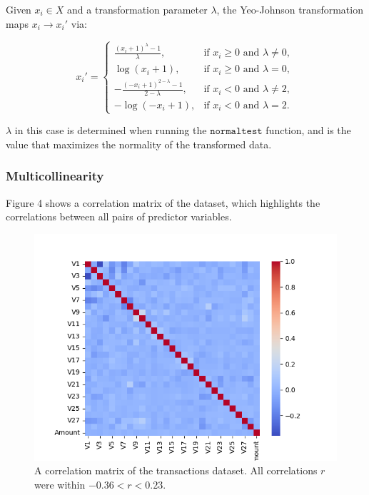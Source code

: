 \documentclass[11pt, oneside]{article}   	%
\begin{document}
Given $x_i \in X$ and a transformation parameter $\lambda$, the Yeo-Johnson transformation maps $x_i \to x_i' $ via:

\begin{equation}
x_i' =
\begin{cases} 
\frac{(x_i + 1)^\lambda - 1}{\lambda}, & \text{if } x_i \geq 0 \text{ and } \lambda \neq 0, \\
\log(x_i + 1), & \text{if } x_i \geq 0 \text{ and } \lambda = 0, \\
-\frac{(-x_i + 1)^{2 - \lambda} - 1}{2 - \lambda}, & \text{if } x_i < 0 \text{ and } \lambda \neq 2, \\
-\log(-x_i + 1), & \text{if } x_i < 0 \text{ and } \lambda = 2.
\end{cases}
\end{equation}

$ \lambda$ in this case is determined when running the $\texttt{normaltest}$ function, and is the value that maximizes the normality of the transformed data. 




\subsubsection{Multicollinearity}

Figure 4 shows a correlation matrix of the dataset, which highlights the correlations between all pairs of predictor variables. 

\begin{figure}[h!]
    \centering
    \includegraphics[width=1.0\textwidth]{figures/fig_4.png}
    \captionsetup{font=small} 
    \caption{A correlation matrix of the transactions dataset. All correlations $r$ were within $-0.36 < r < 0.23$.}
    \label{fig4}
\end{figure}
\end{document}
